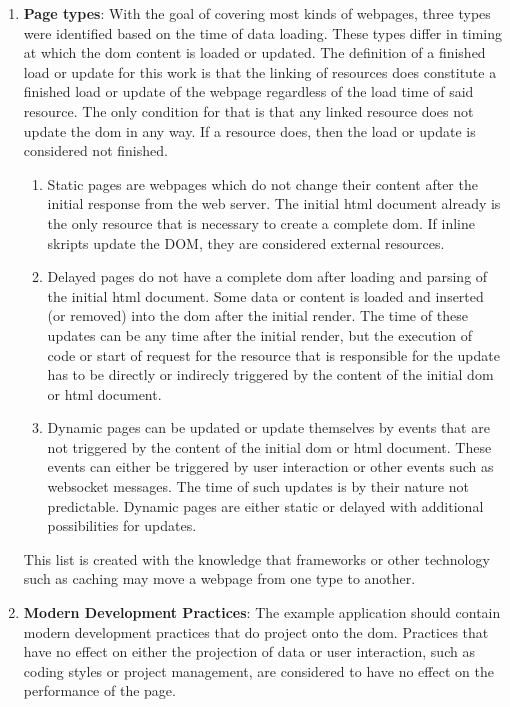 \documentclass[a4paper, 12pt]{article}
\begin{document}
\begin{enumerate}
  \item \textbf{Page types}: With the goal of covering most kinds of webpages, three types were identified based on the time of data loading.\label{enum:pagetypes}
  These types differ in timing at which the \acrshort{dom} content is loaded or updated.
  The definition of a finished load or update for this work is that the linking of resources does constitute a finished load or update of the webpage regardless of the load time of said resource.
  The only condition for that is that any linked resource does not update the \acrshort{dom} in any way.
  If a resource does, then the load or update is considered not finished.
  \begin{enumerate}
    \item Static pages are webpages which do not change their content after the initial response from the web server.
    The initial \acrshort{html} document already is the only resource that is necessary to create a complete \acrshort{dom}.
    If inline skripts update the DOM, they are considered external resources.
    \item Delayed pages do not have a complete \acrshort{dom} after loading and parsing of the initial \acrshort{html} document.
    Some data or content is loaded and inserted (or removed) into the \acrshort{dom} after the initial render.
    The time of these updates can be any time after the initial render, but the execution of code or start of request for the resource that is responsible for the update has to be directly or indirecly triggered by the content of the initial \acrshort{dom} or \acrshort{html} document.
    \item Dynamic pages can be updated or update themselves by events that are not triggered by the content of the initial \acrshort{dom} or \acrshort{html} document.
    These events can either be triggered by user interaction or other events such as websocket messages.
    The time of such updates is by their nature not predictable.
    Dynamic pages are either static or delayed with additional possibilities for updates.
  \end{enumerate}
  This list is created with the knowledge that frameworks or other technology such as caching may move a webpage from one type to another.

  \item \textbf{Modern Development Practices}: The example application should contain modern development practices that do project onto the \acrshort{dom}.
  Practices that have no effect on either the projection of data or user interaction, such as coding styles or project management, are considered to have no effect on the performance of the page.
  

\end{enumerate}
\end{document}
